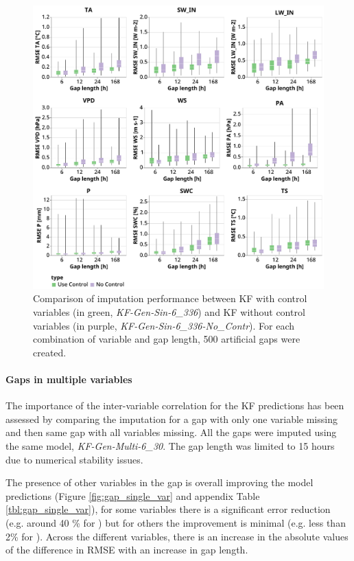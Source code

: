 \documentclass{article}
\newcommand{\imgwidth}{6in}
\begin{document}
\begin{figure}
\centerline{\includegraphics[width=\imgwidth]{use_control}}
\caption{Comparison of imputation performance between KF with control variables (in green, \textit{KF-Gen-Sin-6\_336}) and KF without control variables (in purple, \textit{KF-Gen-Sin-6\_336-No\_Contr}). For each combination of variable and gap length, 500 artificial gaps were created.}
\label{fig:control}
\end{figure}

\paragraph{Gaps in multiple variables} The importance of the inter-variable correlation for the KF predictions has been assessed by comparing the imputation for a gap with only one variable missing and then same gap with all variables missing. All the gaps were imputed using the same model, \textit{KF-Gen-Multi-6\_30}. The gap length was limited to 15 hours due to numerical stability issues.

The presence of other variables in the gap is overall improving the model predictions (Figure \ref{fig:gap_single_var} and appendix Table \ref{tbl:gap_single_var}), for some variables there is a significant error reduction (e.g. around 40 \% for ) but for others the improvement is minimal (e.g. less than 2\% for ).
Across the different variables, there is an increase in the absolute values of the difference in RMSE with an increase in gap length.
\end{document}
